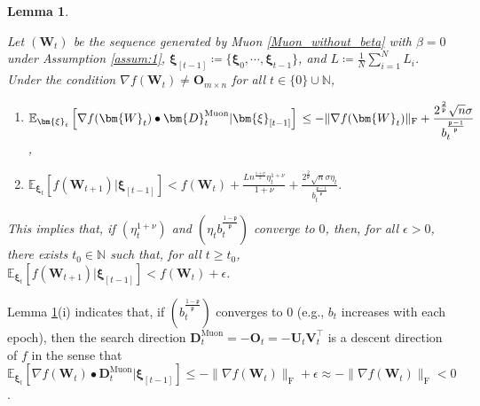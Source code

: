 \documentclass[twoside,11pt]{article}
\newtheorem{lem}{Lemma}[section]
\begin{document}
\begin{lem}\label{lem:muon_without_descent}
{\em 
Let $(\bm{W}_t)$ be the sequence generated by Muon \eqref{Muon_without_beta} with $\beta = 0$ under Assumption \ref{assum:1}, $\bm{\xi}_{[t-1]} \coloneqq \{ \bm{\xi}_0, \cdots, \bm{\xi}_{t-1} \}$, and $L \coloneqq \frac{1}{N} \sum_{i=1}^N L_i$. Under the condition $\nabla f (\bm{W}_t) \neq \bm{O}_{m \times n}$ for all $t \in \{0\} \cup \mathbb{N}$,
\begin{enumerate}
\item[(i)]
$\displaystyle{
\mathbb{E}_{\bm{\xi}_t} \left[\nabla f (\bm{W}_t) \bullet \bm{D}_t^{\mathrm{Muon}}|\bm{\xi}_{[t-1]} \right]\\ 
\leq 
- \| \nabla f (\bm{W}_t) \|_{\mathrm{F}}
+ 
\frac{2^{\frac{2}{\mathfrak{p}}} \sqrt{n} \sigma}{b_t^{\frac{\mathfrak{p} -1}{\mathfrak{p}}}}
}$,
\item[(ii)] 
$\displaystyle{
\mathbb{E}_{\bm{\xi}_t} \left[f (\bm{W}_{t+1}) |\bm{\xi}_{[t-1]} \right] 
<
f(\bm{W}_{t})
+ 
\frac{L n^{\frac{1 + \nu}{2}} \eta_t^{1 + \nu}}{1 + \nu} 
+ 
\frac{2^{\frac{2}{\mathfrak{p}}} \sqrt{n} \sigma \eta_t}{b_t^{\frac{\mathfrak{p} -1}{\mathfrak{p}}}}. 
}$
\end{enumerate}
This implies that, if $(\eta_t^{1 + \nu})$ and $(\eta_t {b_t^{\frac{1 - \mathfrak{p}}{\mathfrak{p}}}})$ converge to $0$, then, for all $\epsilon > 0$, there exists $t_0 \in \mathbb{N}$ such that, for all $t \geq t_0$, $\mathbb{E}_{\bm{\xi}_t} \left[f (\bm{W}_{t+1}) |\bm{\xi}_{[t-1]} \right] < f(\bm{W}_t) + \epsilon$.
}
\end{lem}

Lemma \ref{lem:muon_without_descent}(i) indicates that, if 
$({b_t^{\frac{1 - \mathfrak{p}}{\mathfrak{p}}}})$ converges to $0$ (e.g., $b_t$ increases with each epoch), then the search direction $\bm{D}_t^{\mathrm{Muon}} = - \bm{O}_t = - \bm{U}_t \bm{V}_t^\top$ is a descent direction of $f$ in the sense that 
$\mathbb{E}_{\bm{\xi}_t} [\nabla f (\bm{W}_t) \bullet \bm{D}_t^{\mathrm{Muon}}|\bm{\xi}_{[t-1]} ] 
\leq - \| \nabla f (\bm{W}_t) \|_{\mathrm{F}} + \epsilon
\approx - \| \nabla f (\bm{W}_t) \|_{\mathrm{F}} < 0$.
\end{document}
